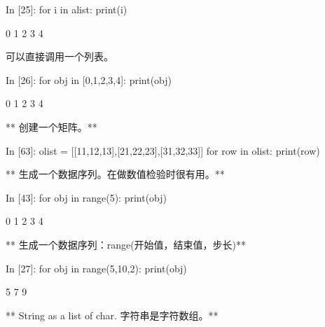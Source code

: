 \documentclass[letterpaper,10pt,english]{sphinxmanual}
\begin{document}
\begin{OriginalVerbatim}[commandchars=\\\{\}]
\textcolor{nbsphinxin}{In [25]: }for i in alist:
             print(i)
\end{OriginalVerbatim}
\begin{OriginalVerbatim}[commandchars=\\\{\}]
0
1
2
3
4
\end{OriginalVerbatim}
可以直接调用一个列表。

\begin{OriginalVerbatim}[commandchars=\\\{\}]
\textcolor{nbsphinxin}{In [26]: }for obj in [0,1,2,3,4]:
             print(obj)
\end{OriginalVerbatim}
\begin{OriginalVerbatim}[commandchars=\\\{\}]
0
1
2
3
4
\end{OriginalVerbatim}
** 创建一个矩阵。**

\begin{OriginalVerbatim}[commandchars=\\\{\}]
\textcolor{nbsphinxin}{In [63]: }olist = [[11,12,13],[21,22,23],[31,32,33]]
         for row in olist:
             print(row)
\end{OriginalVerbatim}
\begin{OriginalVerbatim}[commandchars=\\\{\}]
[11, 12, 13]
[21, 22, 23]
[31, 32, 33]
\end{OriginalVerbatim}
** 生成一个数据序列。在做数值检验时很有用。**

\begin{OriginalVerbatim}[commandchars=\\\{\}]
\textcolor{nbsphinxin}{In [43]: }for obj in range(5):
             print(obj)
\end{OriginalVerbatim}
\begin{OriginalVerbatim}[commandchars=\\\{\}]
0
1
2
3
4
\end{OriginalVerbatim}
** 生成一个数据序列：range(开始值，结束值，步长)**

\begin{OriginalVerbatim}[commandchars=\\\{\}]
\textcolor{nbsphinxin}{In [27]: }for obj in range(5,10,2):
             print(obj)
\end{OriginalVerbatim}
\begin{OriginalVerbatim}[commandchars=\\\{\}]
5
7
9
\end{OriginalVerbatim}
** String as a list of char. 字符串是字符数组。**
\end{document}
